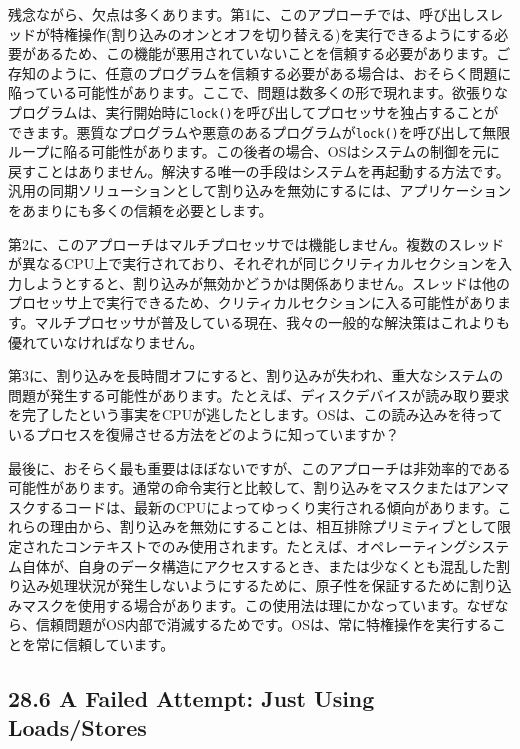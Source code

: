 残念ながら、欠点は多くあります。第1に、このアプローチでは、呼び出しスレッドが特権操作(割り込みのオンとオフを切り替える)を実行できるようにする必要があるため、この機能が悪用されていないことを信頼する必要があります。ご存知のように、任意のプログラムを信頼する必要がある場合は、おそらく問題に陥っている可能性があります。ここで、問題は数多くの形で現れます。欲張りなプログラムは、実行開始時に\texttt{lock()}を呼び出してプロセッサを独占することができます。悪質なプログラムや悪意のあるプログラムが\texttt{lock()}を呼び出して無限ループに陥る可能性があります。この後者の場合、OSはシステムの制御を元に戻すことはありません。解決する唯一の手段はシステムを再起動する方法です。汎用の同期ソリューションとして割り込みを無効にするには、アプリケーションをあまりにも多くの信頼を必要とします。

第2に、このアプローチはマルチプロセッサでは機能しません。複数のスレッドが異なるCPU上で実行されており、それぞれが同じクリティカルセクションを入力しようとすると、割り込みが無効かどうかは関係ありません。スレッドは他のプロセッサ上で実行できるため、クリティカルセクションに入る可能性があります。マルチプロセッサが普及している現在、我々の一般的な解決策はこれよりも優れていなければなりません。

第3に、割り込みを長時間オフにすると、割り込みが失われ、重大なシステムの問題が発生する可能性があります。たとえば、ディスクデバイスが読み取り要求を完了したという事実をCPUが逃したとします。OSは、この読み込みを待っているプロセスを復帰させる方法をどのように知っていますか？

最後に、おそらく最も重要はほぼないですが、このアプローチは非効率的である可能性があります。通常の命令実行と比較して、割り込みをマスクまたはアンマスクするコードは、最新のCPUによってゆっくり実行される傾向があります。これらの理由から、割り込みを無効にすることは、相互排除プリミティブとして限定されたコンテキストでのみ使用されます。たとえば、オペレーティングシステム自体が、自身のデータ構造にアクセスするとき、または少なくとも混乱した割り込み処理状況が発生しないようにするために、原子性を保証するために割り込みマスクを使用する場合があります。この使用法は理にかなっています。なぜなら、信頼問題がOS内部で消滅するためです。OSは、常に特権操作を実行することを常に信頼しています。

\hypertarget{a-failed-attempt-just-using-loadsstores}{%
\subsection*{28.6 A Failed Attempt: Just Using
Loads/Stores}\label{a-failed-attempt-just-using-loadsstores}}


